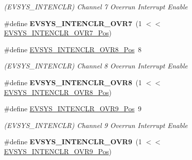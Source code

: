 \begin{DoxyCompactItemize}
\begin{DoxyCompactList}\small\item\em (E\+V\+S\+Y\+S\+\_\+\+I\+N\+T\+E\+N\+C\+L\+R) Channel 7 Overrun Interrupt Enable \end{DoxyCompactList}\item 
\hypertarget{group___s_a_m_l21___e_v_s_y_s_gab5b1bf3c8fc7666fb16065540607ac3e}{}\#define {\bfseries E\+V\+S\+Y\+S\+\_\+\+I\+N\+T\+E\+N\+C\+L\+R\+\_\+\+O\+V\+R7}~(1 $<$$<$ \hyperlink{group___s_a_m_l21___e_v_s_y_s_gac509056e9b76f2bf5cdc1968b2a079eb}{E\+V\+S\+Y\+S\+\_\+\+I\+N\+T\+E\+N\+C\+L\+R\+\_\+\+O\+V\+R7\+\_\+\+Pos})\label{group___s_a_m_l21___e_v_s_y_s_gab5b1bf3c8fc7666fb16065540607ac3e}

\item 
\hypertarget{group___s_a_m_l21___e_v_s_y_s_ga23164b973bd807769cfbd9fd2c8eff99}{}\#define \hyperlink{group___s_a_m_l21___e_v_s_y_s_ga23164b973bd807769cfbd9fd2c8eff99}{E\+V\+S\+Y\+S\+\_\+\+I\+N\+T\+E\+N\+C\+L\+R\+\_\+\+O\+V\+R8\+\_\+\+Pos}~8\label{group___s_a_m_l21___e_v_s_y_s_ga23164b973bd807769cfbd9fd2c8eff99}

\begin{DoxyCompactList}\small\item\em (E\+V\+S\+Y\+S\+\_\+\+I\+N\+T\+E\+N\+C\+L\+R) Channel 8 Overrun Interrupt Enable \end{DoxyCompactList}\item 
\hypertarget{group___s_a_m_l21___e_v_s_y_s_ga8d07e3837bbd5a3b401980de9d9f7cd7}{}\#define {\bfseries E\+V\+S\+Y\+S\+\_\+\+I\+N\+T\+E\+N\+C\+L\+R\+\_\+\+O\+V\+R8}~(1 $<$$<$ \hyperlink{group___s_a_m_l21___e_v_s_y_s_ga23164b973bd807769cfbd9fd2c8eff99}{E\+V\+S\+Y\+S\+\_\+\+I\+N\+T\+E\+N\+C\+L\+R\+\_\+\+O\+V\+R8\+\_\+\+Pos})\label{group___s_a_m_l21___e_v_s_y_s_ga8d07e3837bbd5a3b401980de9d9f7cd7}

\item 
\hypertarget{group___s_a_m_l21___e_v_s_y_s_ga9cd7b659360c7388a772ac8a9088e072}{}\#define \hyperlink{group___s_a_m_l21___e_v_s_y_s_ga9cd7b659360c7388a772ac8a9088e072}{E\+V\+S\+Y\+S\+\_\+\+I\+N\+T\+E\+N\+C\+L\+R\+\_\+\+O\+V\+R9\+\_\+\+Pos}~9\label{group___s_a_m_l21___e_v_s_y_s_ga9cd7b659360c7388a772ac8a9088e072}

\begin{DoxyCompactList}\small\item\em (E\+V\+S\+Y\+S\+\_\+\+I\+N\+T\+E\+N\+C\+L\+R) Channel 9 Overrun Interrupt Enable \end{DoxyCompactList}\item 
\hypertarget{group___s_a_m_l21___e_v_s_y_s_gacd906bc8b6041b390a106cae5c498a19}{}\#define {\bfseries E\+V\+S\+Y\+S\+\_\+\+I\+N\+T\+E\+N\+C\+L\+R\+\_\+\+O\+V\+R9}~(1 $<$$<$ \hyperlink{group___s_a_m_l21___e_v_s_y_s_ga9cd7b659360c7388a772ac8a9088e072}{E\+V\+S\+Y\+S\+\_\+\+I\+N\+T\+E\+N\+C\+L\+R\+\_\+\+O\+V\+R9\+\_\+\+Pos})\label{group___s_a_m_l21___e_v_s_y_s_gacd906bc8b6041b390a106cae5c498a19}


\end{DoxyCompactItemize}
